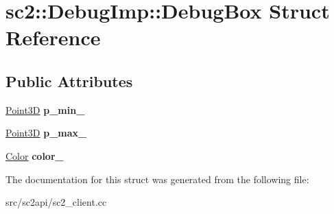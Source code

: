 \hypertarget{structsc2_1_1_debug_imp_1_1_debug_box}{}\section{sc2\+:\+:Debug\+Imp\+:\+:Debug\+Box Struct Reference}
\label{structsc2_1_1_debug_imp_1_1_debug_box}
\subsection*{Public Attributes}
\begin{DoxyCompactItemize}
\item 
\mbox{\label{structsc2_1_1_debug_imp_1_1_debug_box_ae5c078bd8364776a74d8caf06cb03d1d}} 
\hyperlink{structsc2_1_1_point3_d}{Point3D} {\bfseries p\+\_\+min\+\_\+}
\item 
\mbox{\label{structsc2_1_1_debug_imp_1_1_debug_box_a801527e9c76b52b0c4b734d48e5013c2}} 
\hyperlink{structsc2_1_1_point3_d}{Point3D} {\bfseries p\+\_\+max\+\_\+}
\item 
\mbox{\label{structsc2_1_1_debug_imp_1_1_debug_box_ab090dc67d9a9bffb41c857cdcd44531a}} 
\hyperlink{structsc2_1_1_color}{Color} {\bfseries color\+\_\+}
\end{DoxyCompactItemize}


The documentation for this struct was generated from the following file\+:\begin{DoxyCompactItemize}
\item 
src/sc2api/sc2\+\_\+client.\+cc\end{DoxyCompactItemize}
